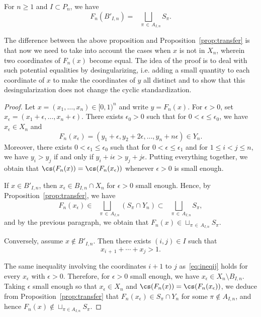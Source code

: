 \begin{prop}\label{prop:transferhalfopen}
For $n\geq1$ and $I\subset P_n$, we have
\[
F_n(B'_{I,n}) =\!\!\!\!\!\!\bigsqcup_{\quad\pi\,\in\,A_{I,n}} S_\pi.
\]
\end{prop}

The difference between the above proposition and Proposition~\ref{prop:transfer} is that now we need to take into account the cases when $x$ is not in $X_n$, wherein two coordinates of $F_n(x)$ become equal. The idea of the proof is to deal with such potential equalities by desingularizing, i.e. adding a small quantity to each coordinate of $x$ to make the coordinates of $y$ all distinct and to show that this desingularization does not change the cyclic standardization.

\begin{proof}
Let $x=(x_1,\ldots,x_n)\in[0,1)^n$ and write $y=F_n(x)$. For $\epsilon>0$, set $x_\epsilon=(x_1+\epsilon,\ldots,x_n+\epsilon)$. There exists $\epsilon_0>0$ such that for $0<\epsilon \leq \epsilon_0$, we have $x_\epsilon \in X_n$ and
\[
F_n(x_\epsilon)= (y_1 + \epsilon, y_2 + 2\epsilon, \dots, y_n + n \epsilon) \in Y_n.
\]
Moreover, there exists $0<\epsilon_1 \leq \epsilon_0$ such that for $0 < \epsilon \leq \epsilon_1$ and for $1\leq i<j \leq n$, we have $y_i > y_j$ if and only if $y_i + i \epsilon > y_j + j \epsilon$. Putting everything together, we obtain that $\cs(F_n(x))=\cs(F_n(x_\epsilon))$ whenever $\epsilon>0$ is small enough.

If $x\in B'_{I,n}$, then $x_\epsilon \in B_{I,n}\cap X_n$ for $\epsilon>0$ small enough. Hence, by Proposition~\ref{prop:transfer}, we have
\[
F_n(x_\epsilon)\in\!\!\!\!\!\bigsqcup_{\quad\pi\,\in\,A_{I,n}} (S_\pi \cap Y_n) \subset\!\!\!\!\!\bigsqcup_{\quad\pi\,\in\,A_{I,n}} S_\pi,
\]
and by the previous paragraph, we obtain that $F_n(x)\in \sqcup_{\pi\,\in\,A_{I,n}} S_\pi$.

Conversely, assume $x\notin B'_{I,n}$. Then there exists $(i,j)\in I$ such that
\begin{equation}\label{eq:ineqij}
x_{i\,+\,1}+\cdots+x_j >1.
\end{equation}

The same inequality involving the coordinates $i+1$ to $j$ as~\eqref{eq:ineqij} holds for every $x_\epsilon$ with $\epsilon>0$. Therefore, for $\epsilon>0$ small enough, we have $x_\epsilon \in X_n \setminus B_{I,n}$. Taking $\epsilon$ small enough so that $x_\epsilon \in X_n$ and $\cs(F_n(x))=\cs(F_n(x_\epsilon))$, we deduce from Proposition~\ref{prop:transfer} that $F_n(x_\epsilon)\in S_\pi \cap Y_n$ for some $\pi \notin A_{I,n}$, and hence $F_n(x) \notin \sqcup_{\pi\in A_{I,n}} S_\pi$.
\end{proof}

